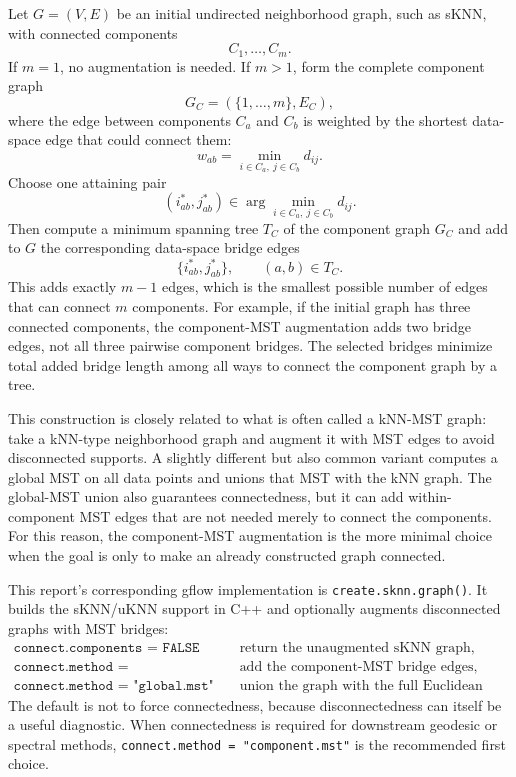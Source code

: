 \documentclass[11pt]{article}
\begin{document}
Let \(G=(V,E)\) be an initial undirected neighborhood graph, such as sKNN, with connected
components
\[
  C_1,\ldots,C_m.
\]
If \(m=1\), no augmentation is needed.  If \(m>1\), form the complete component graph
\[
  G_C=(\{1,\ldots,m\},E_C),
\]
where the edge between components \(C_a\) and \(C_b\) is weighted by the shortest data-space
edge that could connect them:
\[
  w_{ab}
  =
  \min_{i\in C_a,\ j\in C_b} d_{ij}.
\]
Choose one attaining pair
\[
  (i^\ast_{ab},j^\ast_{ab})
  \in
  \arg\min_{i\in C_a,\ j\in C_b} d_{ij}.
\]
Then compute a minimum spanning tree \(T_C\) of the component graph \(G_C\) and add to \(G\)
the corresponding data-space bridge edges
\[
  \{i^\ast_{ab},j^\ast_{ab}\},
  \qquad
  (a,b)\in T_C.
\]
This adds exactly \(m-1\) edges, which is the smallest possible number of edges that can
connect \(m\) components.  For example, if the initial graph has three connected components,
the component-MST augmentation adds two bridge edges, not all three pairwise component
bridges.  The selected bridges minimize total added bridge length among all ways to connect
the component graph by a tree.

This construction is closely related to what is often called a kNN-MST graph: take a kNN-type
neighborhood graph and augment it with MST edges to avoid disconnected supports.  A slightly
different but also common variant computes a global MST on all data points and unions that
MST with the kNN graph.  The global-MST union also guarantees connectedness, but it can add
within-component MST edges that are not needed merely to connect the components.  For this
reason, the component-MST augmentation is the more minimal choice when the goal is only to
make an already constructed graph connected.

This report's corresponding gflow implementation is \texttt{create.sknn.graph()}.  It builds
the sKNN/uKNN support in C++ and optionally augments disconnected graphs with MST bridges:
\[
\begin{array}{ll}
\texttt{connect.components = FALSE} & \text{return the unaugmented sKNN graph,}\\
\texttt{connect.method = "component.mst"} & \text{add the component-MST bridge edges,}\\
\texttt{connect.method = "global.mst"} & \text{union the graph with the full Euclidean MST.}
\end{array}
\]
The default is not to force connectedness, because disconnectedness can itself be a useful
diagnostic.  When connectedness is required for downstream geodesic or spectral methods,
\texttt{connect.method = "component.mst"} is the recommended first choice.
\end{document}
